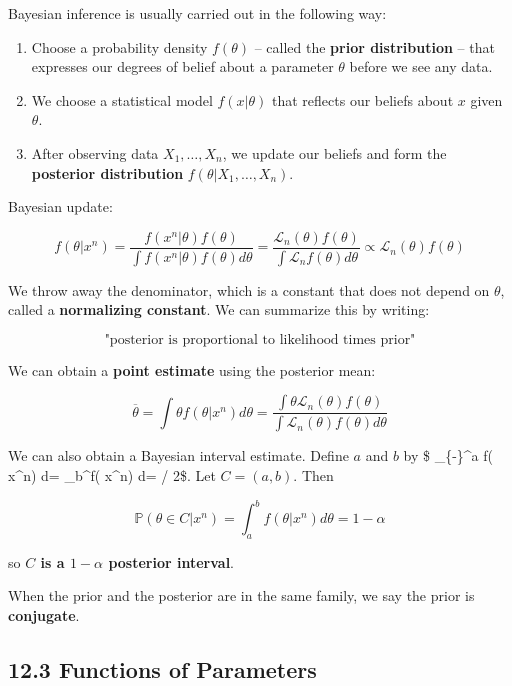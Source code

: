 Bayesian inference is usually carried out in the following way:

\begin{enumerate}[label={\arabic*.}]
\item
  Choose a probability density \(f(\theta)\) -- called the \textbf{prior
  distribution} -- that expresses our degrees of belief about a
  parameter \(\theta\) before we see any data.
\item
  We choose a statistical model \(f(x | \theta)\) that reflects our
  beliefs about \(x\) given \(\theta\).
\item
  After observing data \(X_1, \dots, X_n\), we update our beliefs and
  form the \textbf{posterior distribution}
  \(f(\theta | X_1, \dots, X_n)\).
\end{enumerate}

Bayesian update:

\[f(\theta | x^n) = \frac{f(x^n | \theta) f(\theta)}{\int f(x^n | \theta) f(\theta) d\theta} 
= \frac{\mathcal{L}_n(\theta) f(\theta)}{\int \mathcal{L}_n f(\theta) d\theta}
\propto \mathcal{L}_n(\theta) f(\theta)\]

We throw away the denominator, which is a constant that does not depend
on \(\theta\), called a \textbf{normalizing constant}. We can summarize
this by writing:

\[ \text{"posterior is proportional to likelihood times prior"} \]

We can obtain a \textbf{point estimate} using the posterior mean:

\[ \overline{\theta} = \int \theta f(\theta | x^n) d\theta = \frac{\int \theta \mathcal{L}_n(\theta) f(\theta)}{\int \mathcal{L}_n(\theta) f(\theta) d\theta}\]

We can also obtain a Bayesian interval estimate. Define \(a\) and \(b\)
by \$ \int\_\{-\infty\}\^{}a f(\theta \textbar{} x\^{}n) d\theta =
\int\_b\^{}\infty f(\theta \textbar{} x\^{}n) d\theta = \alpha / 2\$.
Let \(C = (a, b)\). Then

\[\mathbb{P}(\theta \in C | x^n) = \int_a^b f(\theta | x^n) d\theta = 1 - \alpha\]

so \textbf{\(C\) is a \(1 - \alpha\) posterior interval}.

When the prior and the posterior are in the same family, we say the
prior is \textbf{conjugate}.

\subsection{12.3 Functions of
Parameters}\label{functions-of-parameters}

